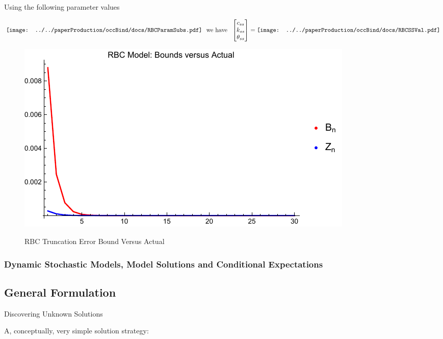 \documentclass[12pt]{article}
\begin{document}
Using the following parameter values

\begin{gather}
\vcenter{\hbox{\texttt{[image: ../../paperProduction/occBind/docs/RBCParamSubs.pdf]}}} \,\, \text{ we have } \,\,
  \begin{bmatrix}
    c_{ss}\\k_{ss} \\ \theta_{ss} \label{rbcparams}
  \end{bmatrix}=
\vcenter{\hbox{\texttt{[image: ../../paperProduction/occBind/docs/RBCSSVal.pdf]}}}
\end{gather}%


\begin{figure}
  \centering
\includegraphics{simpBoundsVActual.pdf}  
  \label{rbcTrunc}
  \caption{RBC Truncation Error Bound Versus Actual}
\end{figure}






\subsubsection{Dynamic Stochastic Models, Model Solutions  and Conditional Expectations}
\label{sec:condExp}
\subsection{General Formulation}
\label{sec:genAux}
  {Discovering Unknown Solutions}

A, conceptually, very simple solution strategy:  
\end{document}
